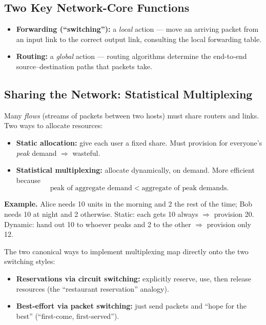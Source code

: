 \documentclass[hidelinks]{article}
\begin{document}
\subsection{Two Key Network-Core Functions}

\begin{itemize}
    \item \textbf{Forwarding (``switching''):} a \emph{local} action ---
    move an arriving packet from an input link to the correct output link,
    consulting the local forwarding table.
    \item \textbf{Routing:} a \emph{global} action --- routing algorithms
    determine the end-to-end source--destination paths that packets take.
\end{itemize}

\subsection{Sharing the Network: Statistical Multiplexing}

Many \emph{flows} (streams of packets between two hosts) must share routers
and links. Two ways to allocate resources:
\begin{itemize}
    \item \textbf{Static allocation:} give each user a fixed share. Must
    provision for everyone's \emph{peak} demand $\Rightarrow$ wasteful.
    \item \textbf{Statistical multiplexing:} allocate dynamically, on
    demand. More efficient because
    \[
        \text{peak of aggregate demand} \;<\; \text{aggregate of peak demands.}
    \]
\end{itemize}

\noindent\textbf{Example.} Alice needs 10 units in the morning and 2 the
rest of the time; Bob needs 10 at night and 2 otherwise. Static: each gets
10 always $\Rightarrow$ provision 20. Dynamic: hand out 10 to whoever peaks
and 2 to the other $\Rightarrow$ provision only 12.

\medskip
\noindent The two canonical ways to implement multiplexing map directly onto
the two switching styles:
\begin{itemize}
    \item \textbf{Reservations via circuit switching:} explicitly reserve,
    use, then release resources (the ``restaurant reservation'' analogy).
    \item \textbf{Best-effort via packet switching:} just send packets and
    ``hope for the best'' (``first-come, first-served'').
\end{itemize}
\end{document}
